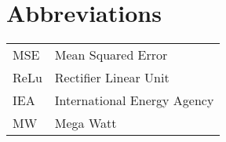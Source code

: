 \chapter{Abbreviations}

\begin{table}[H]
    \centering
    \renewcommand{\arraystretch}{2}
    \begin{tabular}{ll}
		MSE & Mean Squared Error \\
		ReLu & Rectifier Linear Unit \\
		IEA & International Energy Agency \\
		MW  & Mega Watt
    \end{tabular}
\end{table}

\makeatletter
{}
\makeatother